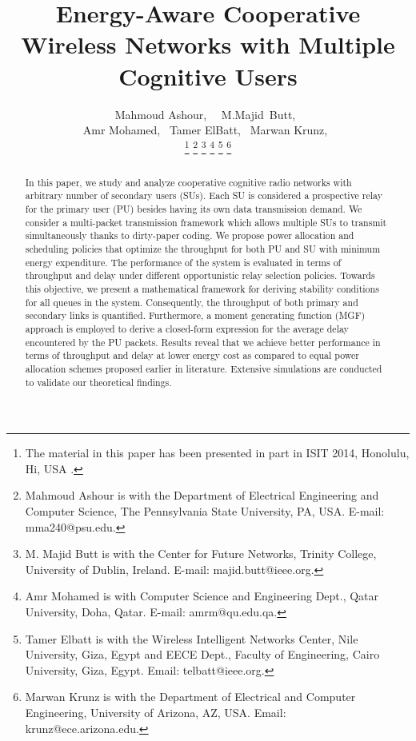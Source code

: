 \documentclass[journal,twocolumn]{IEEEtran}
\begin{document}
\title{Energy-Aware Cooperative Wireless Networks with Multiple Cognitive Users}

\author{Mahmoud Ashour,~~
M.Majid~Butt,~ \\
Amr Mohamed,~
Tamer ElBatt,~
Marwan Krunz,~


\thanks{The material in this paper has been presented in part in ISIT 2014, Honolulu, Hi, USA \cite{Ashour:ISIT}.}
\thanks{Mahmoud Ashour is with the Department of Electrical Engineering and Computer Science, The Pennsylvania State University, PA, USA. E-mail: mma240@psu.edu.}
\thanks{M. Majid Butt is with the Center for Future Networks, Trinity College, University of Dublin, Ireland. 
	E-mail: majid.butt@ieee.org.}
\thanks{Amr Mohamed is with Computer Science and Engineering Dept., Qatar University, Doha, Qatar. E-mail: amrm@qu.edu.qa.}
\thanks{Tamer Elbatt is with the Wireless Intelligent Networks Center, Nile University, Giza, Egypt and EECE Dept., Faculty of Engineering, Cairo University, Giza, Egypt. Email: telbatt@ieee.org.}
\thanks{Marwan Krunz is with the Department of Electrical and Computer Engineering, University of Arizona, AZ, USA. Email: krunz@ece.arizona.edu.}

}



\maketitle

\begin{abstract}
In this paper, we study and analyze cooperative cognitive radio networks 
with arbitrary number of secondary users (SUs). Each SU is considered a prospective relay for the primary user (PU) besides having its own data transmission demand. We consider a multi-packet transmission framework which allows multiple SUs to transmit simultaneously thanks to dirty-paper coding. 
We propose power allocation and scheduling policies that optimize the throughput for both PU and SU with minimum energy expenditure.
The performance of the system is evaluated in terms of throughput and delay under different opportunistic relay selection policies. Towards this objective, we present a mathematical framework for deriving stability conditions for all queues in the system. Consequently, the throughput of both primary and secondary links is quantified. Furthermore, a moment generating function (MGF) approach is employed to derive a closed-form expression for the average delay encountered by the PU packets.
Results reveal that we achieve better performance in terms of throughput and delay at lower energy cost as compared to equal power allocation schemes proposed earlier in literature. Extensive simulations are conducted to validate our theoretical findings.
\end{abstract}
\end{document}
